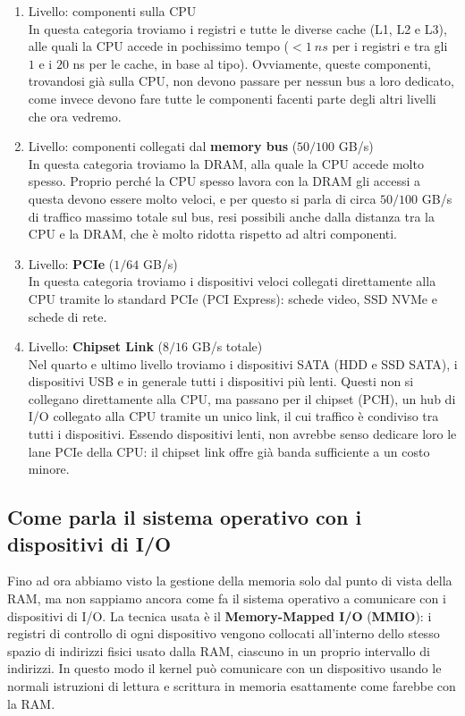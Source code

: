\documentclass[11pt, a4paper, titlepage, oneside]{scrbook}
\begin{document}
\begin{enumerate}[label=\arabic*°]
    \item Livello: componenti sulla CPU \\
    In questa categoria troviamo i registri e tutte le diverse cache (L1, L2 e L3), alle quali la CPU accede in pochissimo tempo ($< \SI{1}{ns}$ per i registri e tra gli $1$ e i $20$ ns per le cache, in base al tipo). Ovviamente, queste componenti, trovandosi già sulla CPU, non devono passare per nessun bus a loro dedicato, come invece devono fare tutte le componenti facenti parte degli altri livelli che ora vedremo.
    \item Livello: componenti collegati dal \textbf{memory bus} ($50/100$ GB/s) \\
    In questa categoria troviamo la DRAM, alla quale la CPU accede molto spesso. Proprio perché la CPU spesso lavora con la DRAM gli accessi a questa devono essere molto veloci, e per questo si parla di circa $50/100$ GB/s di traffico massimo totale sul bus, resi possibili anche dalla distanza tra la CPU e la DRAM, che è molto ridotta rispetto ad altri componenti.
    \item Livello: \textbf{PCIe} ($1/64$ GB/s) \\
    In questa categoria troviamo i dispositivi veloci collegati direttamente alla CPU tramite lo standard PCIe (PCI Express): schede video, SSD NVMe e schede di rete.
    \item Livello: \textbf{Chipset Link} ($8/16$ GB/s totale) \\
    Nel quarto e ultimo livello troviamo i dispositivi SATA (HDD e SSD SATA), i dispositivi USB e in generale tutti i dispositivi più lenti. Questi non si collegano direttamente alla CPU, ma passano per il chipset (PCH), un hub di I/O collegato alla CPU tramite un unico link, il cui traffico è condiviso tra tutti i dispositivi. Essendo dispositivi lenti, non avrebbe senso dedicare loro le lane PCIe della CPU: il chipset link offre già banda sufficiente a un costo minore.
\end{enumerate}

\subsection{Come parla il sistema operativo con i dispositivi di I/O}

Fino ad ora abbiamo visto la gestione della memoria solo dal punto di vista della RAM, ma non sappiamo ancora come fa il sistema operativo a comunicare con i dispositivi di I/O. La tecnica usata è il \textbf{Memory-Mapped I/O} (\textbf{MMIO}): i registri di controllo di ogni dispositivo vengono collocati all'interno dello stesso spazio di indirizzi fisici usato dalla RAM, ciascuno in un proprio intervallo di indirizzi. In questo modo il kernel può comunicare con un dispositivo usando le normali istruzioni di lettura e scrittura in memoria esattamente come farebbe con la RAM.
\end{document}
